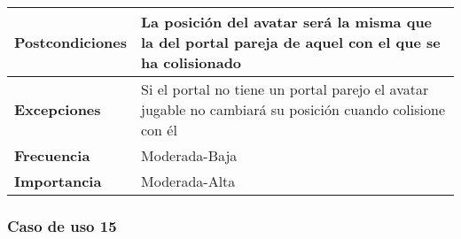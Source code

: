 \begin{tabularx}{\columnwidth}{l|l}
\begin{minipage}{0.25\columnwidth}
\textbf{Postcondiciones} 
\end{minipage}
&
\begin{minipage}{0.65\columnwidth}
La posición del avatar será la misma que la del portal pareja de aquel con el que se ha colisionado
\end{minipage}
\\ \hline

\begin{minipage}{0.25\columnwidth}
\textbf{Excepciones} 
\end{minipage}
&
\begin{minipage}{0.65\columnwidth}
Si el portal no tiene un portal parejo el avatar jugable no cambiará su posición cuando colisione con él 
\end{minipage}
\\ \hline

\begin{minipage}{0.25\columnwidth}
\textbf{Frecuencia} 
\end{minipage}
&
\begin{minipage}{0.65\columnwidth}
Moderada-Baja
\end{minipage}
\\ \hline

\begin{minipage}{0.25\columnwidth}
\textbf{Importancia} 
\end{minipage}
&
\begin{minipage}{0.65\columnwidth}
Moderada-Alta
\end{minipage}
\\ \hline
\end{tabularx}

\subsubsection{Caso de uso 15}

